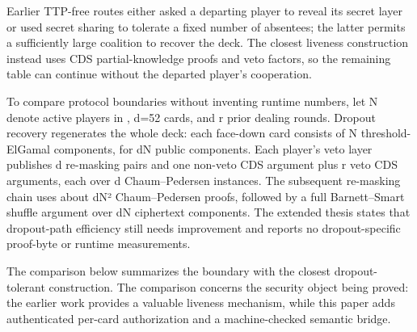 \documentclass[11pt]{article}
\begin{document}
Earlier TTP-free routes either asked a departing player to reveal its secret layer or used secret sharing to tolerate a fixed number of absentees; the latter permits a sufficiently large coalition to recover the deck. The closest liveness construction \cite{ref7} instead uses CDS partial-knowledge proofs and veto factors, so the remaining table can continue without the departed player’s cooperation.

To compare protocol boundaries without inventing runtime numbers, let N denote active players in \cite{ref7}, d=52 cards, and r prior dealing rounds. Dropout recovery regenerates the whole deck: each face-down card consists of N threshold-ElGamal components, for dN public components. Each player’s veto layer publishes d re-masking pairs and one non-veto CDS argument plus r veto CDS arguments, each over d Chaum–Pedersen instances. The subsequent re-masking chain uses about dN² Chaum–Pedersen proofs, followed by a full Barnett–Smart shuffle argument over dN ciphertext components. The extended thesis \cite{ref8} states that dropout-path efficiency still needs improvement and reports no dropout-specific proof-byte or runtime measurements.

The comparison below summarizes the boundary with the closest dropout-tolerant construction. The comparison concerns the security object being proved: the earlier work provides a valuable liveness mechanism, while this paper adds authenticated per-card authorization and a machine-checked semantic bridge.
\end{document}

